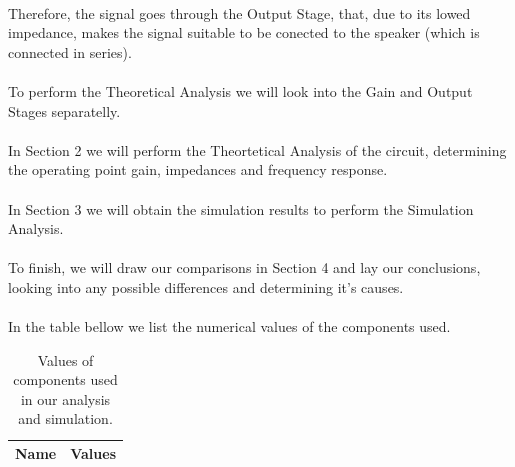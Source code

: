 \paragraph{} Therefore, the signal goes through the Output Stage, that, due to its lowed impedance, makes the signal suitable to be conected to the speaker (which is connected in series).

\paragraph{} To perform the Theoretical Analysis we will look into the Gain and Output Stages separatelly.

\paragraph{} In Section 2 we will perform the Theortetical Analysis of the circuit, determining the operating point gain, impedances and frequency response.

\paragraph{} In Section 3 we will obtain the simulation results to perform the Simulation Analysis.

\paragraph{} To finish, we will draw our comparisons in Section 4 and lay our conclusions, looking into any possible differences and determining it's causes.

\paragraph{} In the table bellow we list the numerical values of the components used.

\begin{table}[h]
  \centering
  \begin{tabular}{|l|r|}
    \hline    
    {\bf Name} & {\bf Values} \\ \hline
     
  \end{tabular}
  \caption{Values of components used in our analysis and simulation.}
  \label{tab:data}
\end{table}


\clearpage
